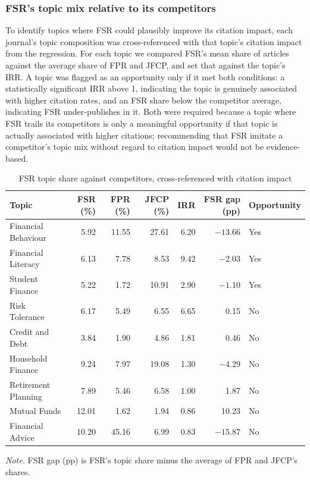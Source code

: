 \documentclass[11pt,a4paper]{article}
\newcommand{\tablenote}[1]{\par\smallskip\parbox{\linewidth}{\footnotesize\textit{Note.} #1}}
\begin{document}
\subsubsection{FSR's topic mix relative to its competitors}\label{qb-opportunity}

To identify topics where FSR could plausibly improve its citation impact, each journal's topic composition was cross-referenced with that topic's citation impact from the regression. For each topic we compared FSR's mean share of articles against the average share of FPR and JFCP, and set that against the topic's IRR. A topic was flagged as an opportunity only if it met both conditions: a statistically significant IRR above 1, indicating the topic is genuinely associated with higher citation rates, and an FSR share below the competitor average, indicating FSR under-publishes in it. Both were required because a topic where FSR trails its competitors is only a meaningful opportunity if that topic is actually associated with higher citations; recommending that FSR imitate a competitor's topic mix without regard to citation impact would not be evidence-based.

\begin{table}[htbp]
\centering
\small
\caption{FSR topic share against competitors, cross-referenced with citation impact}
\label{tab:qb_gap}
\begin{tabular}{lrrrrrl}
\toprule
Topic & FSR (\%) & FPR (\%) & JFCP (\%) & IRR & FSR gap (pp) & Opportunity \\
\midrule
Financial Behaviour & 5.92 & 11.55 & 27.61 & 6.20 & $-13.66$ & Yes \\
Financial Literacy & 6.13 & 7.78 & 8.53 & 9.42 & $-2.03$ & Yes \\
Student Finance & 5.22 & 1.72 & 10.91 & 2.90 & $-1.10$ & Yes \\
Risk Tolerance & 6.17 & 5.49 & 6.55 & 6.65 & 0.15 & No \\
Credit and Debt & 3.84 & 1.90 & 4.86 & 1.81 & 0.46 & No \\
Household Finance & 9.24 & 7.97 & 19.08 & 1.30 & $-4.29$ & No \\
Retirement Planning & 7.89 & 5.46 & 6.58 & 1.00 & 1.87 & No \\
Mutual Funds & 12.01 & 1.62 & 1.94 & 0.86 & 10.23 & No \\
Financial Advice & 10.20 & 45.16 & 6.99 & 0.83 & $-15.87$ & No \\
\bottomrule
\end{tabular}
\tablenote{FSR gap (pp) is FSR's topic share minus the average of FPR and JFCP's shares.}
\end{table}
\end{document}
